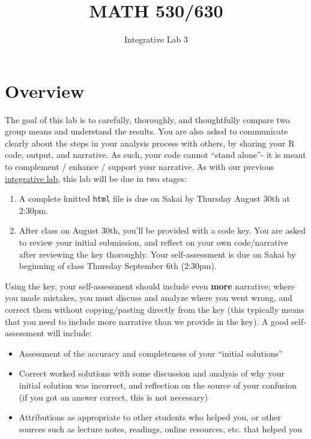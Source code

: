 \documentclass[]{article}
\title{MATH 530/630}
\subtitle{Integrative Lab 3}
\author{}
\date{}
\providecommand{\tightlist}{%
  \setlength{\itemsep}{0pt}\setlength{\parskip}{0pt}}
\begin{document}
\maketitle

{
\setcounter{tocdepth}{2}
\tableofcontents
}
\section{Overview}\label{overview}

The goal of this lab is to carefully, thoroughly, and thoughtfully
compare two group means and understand the results. You are also asked
to communicate clearly about the steps in your analysis process with
others, by sharing your R code, output, and narrative. As such, your
code cannot ``stand alone''- it is meant to complement / enhance /
support your narrative. As with our previous
\href{cm026.html}{integrative lab}, this lab will be due in two stages:

\begin{enumerate}
\def\labelenumi{\arabic{enumi}.}
\tightlist
\item
  A complete knitted \texttt{html} file is due on Sakai by Thursday
  August 30th at 2:30pm.
\item
  After class on August 30th, you'll be provided with a code key. You
  are asked to review your initial submission, and reflect on your own
  code/narrative after reviewing the key thoroughly. Your
  self-assessment is due on Sakai by beginning of class Thursday
  September 6th (2:30pm).
\end{enumerate}

Using the key, your self-assessment should include even \textbf{more}
narrative; where you made mistakes, you must discuss and analyze where
you went wrong, and correct them without copying/pasting directly from
the key (this typically means that you need to include more narrative
than we provide in the key). A good self-assessment will include:

\begin{itemize}
\tightlist
\item
  Assessment of the accuracy and completeness of your ``initial
  solutions''
\item
  Correct worked solutions with some discussion and analysis of why your
  initial solution was incorrect, and reflection on the source of your
  confusion (if you got an answer correct, this is not necessary)
\item
  Attributions as appropriate to other students who helped you, or other
  sources such as lecture notes, readings, online resources, etc. that
  helped you
\end{itemize}
\end{document}
